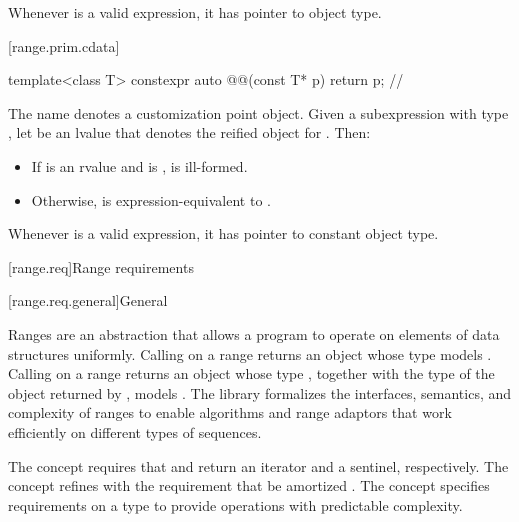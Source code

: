 \pnum
\begin{note}
Whenever  is a valid expression, it
has pointer to object type.
\end{note}

[range.prim.cdata]{}
%

\begin{codeblock}
template<class T>
constexpr auto @@(const T* p) { return p; }   // \expos
\end{codeblock}

\pnum
The name  denotes a customization point
object.
Given a subexpression  with type ,
let  be an lvalue that denotes the reified object for .
Then:
\begin{itemize}
\item
If  is an rvalue and
 is ,
 is ill-formed.
\item
Otherwise,
 is expression-equivalent to
.
\end{itemize}

\pnum
\begin{note}
Whenever  is a valid expression, it
has pointer to constant object type.
\end{note}

[range.req]{Range requirements}

[range.req.general]{General}

\pnum
Ranges are an abstraction that allows a \Cpp{} program
to operate on elements of data structures uniformly.
Calling  on a range returns an object
whose type models .
Calling  on a range returns an object whose type ,
together with the type  of the object returned by ,
models .
The library formalizes the interfaces, semantics, and complexity of ranges
to enable algorithms and range adaptors that work efficiently
on different types of sequences.

\pnum
The  concept requires that
 and 
return an iterator and a sentinel, respectively.
The  concept refines  with
the requirement that  be amortized .
The  concept specifies requirements on
a  type to provide operations with predictable complexity.

